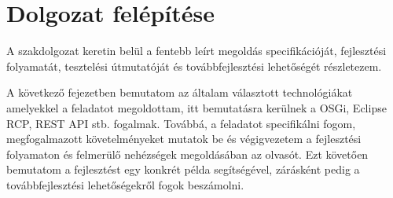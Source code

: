 \section{Dolgozat felépítése}

A szakdolgozat keretin belül a fentebb leírt megoldás specifikációját, fejlesztési folyamatát, tesztelési útmutatóját és továbbfejlesztési lehetőségét részletezem.

A következő fejezetben bemutatom az általam választott technológiákat amelyekkel a feladatot megoldottam, itt bemutatásra kerülnek a OSGi, Eclipse RCP, REST API stb. fogalmak. Továbbá, a feladatot specifikálni fogom, megfogalmazott követelményeket mutatok be és végigvezetem a fejlesztési folyamaton és felmerülő nehézségek megoldásában az olvasót. Ezt követően bemutatom a fejlesztést egy konkrét példa segítségével, zárásként pedig a továbbfejlesztési lehetőségekről fogok beszámolni.





















